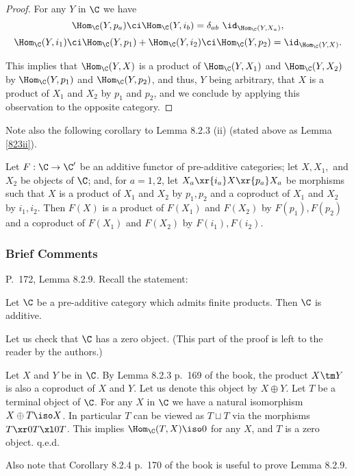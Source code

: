 \documentclass[12pt]{article}
\theoremstyle{remark}
\theoremstyle{definition}
\begin{document}
\begin{proof}
For any $Y$ in $\C$ we have 
$$
\Hom_\C(Y,p_a)\ci\Hom_\C(Y,i_b)=\delta_{ab}\ \id_{\Hom_\C(Y,X_a)},
$$ 
$$
\Hom_\C(Y,i_1)\ci\Hom_\C(Y,p_1)+\Hom_\C(Y,i_2)\ci\Hom_\C(Y,p_2)=\id_{\Hom_\C(Y,X)}.
$$ 

\nn This implies that $\Hom_\C(Y,X)$ is a product of $\Hom_\C(Y,X_1)$ and $\Hom_\C(Y,X_2)$ by $\Hom_\C(Y,p_1)$ and $\Hom_\C(Y,p_2)$, and thus, $Y$ being arbitrary, that $X$ is a product of $X_1$ and $X_2$ by $p_1$ and $p_2$, and we conclude by applying this observation to the opposite category.
\end{proof}

Note also the following corollary to Lemma 8.2.3 (ii) (stated above as Lemma \ref{823ii}). 

\begin{cor}
Let $F:\C\to\C'$ be an additive functor of pre-additive categories; let $X,X_1,$ and $X_2$ be objects of $\C$; and, for $a=1,2$, let $X_a\xr{i_a}X\xr{p_a}X_a$ be morphisms such that $X$ is a product of $X_1$ and $X_2$ by $p_1,p_2$ and a coproduct of $X_1$ and $X_2$ by $i_1,i_2$. Then $F(X)$ is a product of $F(X_1)$ and $F(X_2)$ by $F(p_1),F(p_2)$ and a coproduct of $F(X_1)$ and $F(X_2)$ by $F(i_1),F(i_2)$. 
\end{cor}


\subsubsection{Brief Comments}

\begin{s} 
P.~172, Lemma 8.2.9. Recall the statement:

\begin{lem}[Lemma 8.2.9 p. 172] 
Let $\C$ be a pre-additive category which admits finite products. Then $\C$ is additive.
\end{lem}

Let us check that $\C$ has a zero object. (This part of the proof is left to the reader by the authors.) 

Let $X$ and $Y$ be in $\C$. By Lemma 8.2.3 p.~169 of the book, the product $X\tm Y$ is also a coproduct of $X$ and $Y$. Let us denote this object by $X\oplus Y$. Let $T$ be a terminal object of $\C$. For any $X$ in $\C$ we have a natural isomorphism $X\oplus T\iso X$. In particular $T$ can be viewed as $T\sqcup T$ via the morphisms $T\xr0T\xl0T$. This implies $\Hom_\C(T,X)\iso0$ for any $X$, and $T$ is a zero object. q.e.d.

Also note that Corollary 8.2.4 p.~170 of the book is useful to prove Lemma 8.2.9.
\end{s}
\end{document}
